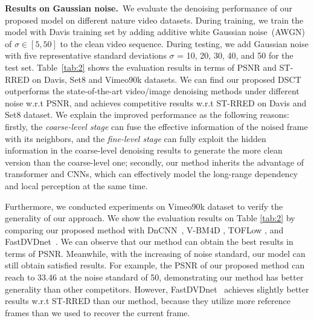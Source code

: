 \documentclass[journal]{IEEEtran}
\begin{document}
\noindent
\textbf{Results on Gaussian noise.}~We evaluate the denoising performance of our proposed model on different nature video datasets. During training, we train the model with Davis training set by adding additive white Gaussian noise~(AWGN) of $\sigma \in[5,50]$ to the clean video sequence. During testing, we add Gaussian noise with five representative standard deviations $\sigma$ = 10, 20, 30, 40, and 50 for the test set. Table~\ref{tab:2} shows the evaluation results in terms of PSNR and ST-RRED on Davis, Set8 and Vimeo90k datasets. We can find our proposed DSCT outperforms the state-of-the-art video/image denoising methods under different noise w.r.t PSNR, and achieves competitive results w.r.t ST-RRED on Davis and Set8 dataset. We explain the improved performance as the following reasons: firstly, the \emph{coarse-level stage} can fuse the effective information of the noised frame with its neighbors, and the \emph{fine-level stage} can fully exploit the hidden information in the coarse-level denoising results to generate the more clean version than the coarse-level one; secondly, our method inherits the advantage of transformer and CNNs, which can effectively model the long-range dependency and local perception at the same time. 

Furthermore, we conducted experiments on Vimeo90k dataset to verify the generality of our approach. We show the evaluation results on Table \ref{tab:2} by comparing our proposed method with DnCNN~\cite{Zhang2017BeyondAG}, V-BM4D \cite{Maggioni2012VideoDD}, TOFLow \cite{xue2019video}, and FastDVDnet~\cite{Tassano2020FastDVDnetTR}. We can observe that our method can obtain the best results in terms of PSNR. Meanwhile, with the increasing of noise standard, our model can still obtain satisfied results. For example, the PSNR of our proposed method can reach to 33.46 at the noise standard of 50, demonstrating our method has better generality than other competitors. 
However, FastDVDnet~\cite{Tassano2020FastDVDnetTR} achieves slightly better results w.r.t ST-RRED than our method, because they utilize more reference frames than we used to recover the current frame. 
\end{document}

